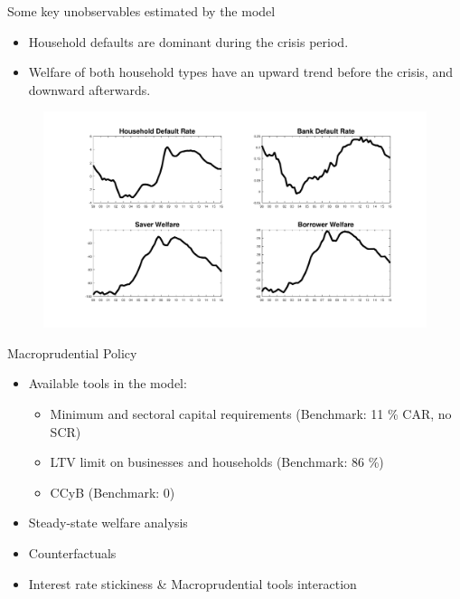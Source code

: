 \documentclass[8pt,aspectratio=169]{beamer}
\numberwithin{equation}{section}
\begin{document}
\begin{frame}{Some key unobservables estimated by the model}

\begin{itemize}
\item Household defaults are dominant during the crisis period.
\item Welfare of both household types have an upward trend before the crisis, and downward afterwards.

\end{itemize}    

\begin{figure}
\includegraphics[scale=0.25]{smoothed_variables.pdf}
\end{figure}


\end{frame}



\begin{frame}{Macroprudential Policy}

\begin{itemize}

\item Available tools in the model: 
\vspace{3 mm}
\begin{itemize}
\item Minimum and sectoral capital requirements (Benchmark: 11 \% CAR, no SCR)
\vspace{3 mm}
\item LTV limit on businesses and households (Benchmark: 86 \%)
\vspace{3 mm}
\item CCyB (Benchmark: 0)
\end{itemize}

\pause 

\vspace{5 mm}
\item Steady-state welfare analysis
\vspace{5 mm}
\item Counterfactuals
\vspace{5 mm}
\item Interest rate stickiness \& Macroprudential tools interaction

\end{itemize}
\end{frame}
\end{document}
